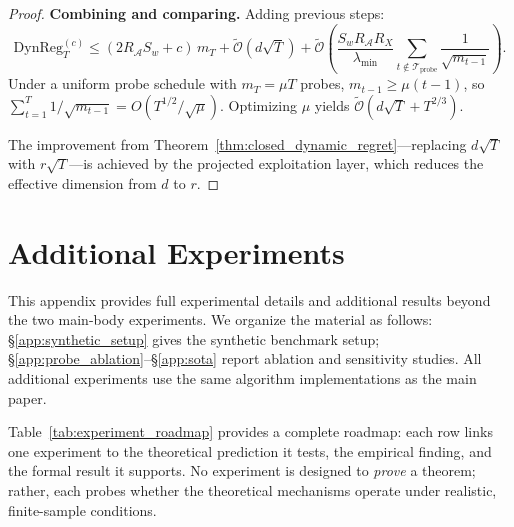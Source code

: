 \documentclass{article}
\newcommand{\cA}{\mathcal{A}}
\newcommand{\cTprobe}{\mathcal{T}_{\mathrm{probe}}}
\newcommand{\tilO}{\widetilde{\mathcal{O}}}
\newcommand{\DynReg}{\mathrm{DynReg}}
\begin{document}
\begin{proof}
\textbf{Combining and comparing.}
Adding previous steps:
\[
\DynReg_T^{(c)} \le (2R_{\cA} S_w + c)\,m_T + \tilO(d\sqrt{T}) + \tilO\!\left(\frac{S_w R_{\cA} R_X}{\lambda_{\min}}\sum_{t \notin \cTprobe}\frac{1}{\sqrt{m_{t-1}}}\right).
\]
Under a uniform probe schedule with $m_T = \mu T$ probes, $m_{t-1} \ge \mu(t-1)$, so $\sum_{t=1}^T 1/\sqrt{m_{t-1}} = O(T^{1/2}/\sqrt{\mu})$.  Optimizing $\mu$ yields $\tilO(d\sqrt{T} + T^{2/3})$.

The improvement from Theorem~\ref{thm:closed_dynamic_regret}---replacing $d\sqrt{T}$ with $r\sqrt{T}$---is achieved by the projected exploitation layer, which reduces the effective dimension from $d$ to $r$.
\end{proof}

\section{Additional Experiments}
\label{app:additional_experiments}


This appendix provides full experimental details and additional results
beyond the two main-body experiments.
We organize the material as follows:
\S\ref{app:synthetic_setup} gives the synthetic benchmark setup;
\S\ref{app:probe_ablation}--\S\ref{app:sota} report ablation and
sensitivity studies.
All additional experiments use the same algorithm implementations as
the main paper.

Table~\ref{tab:experiment_roadmap} provides a complete roadmap: each row links one experiment to the theoretical prediction it
  tests, the empirical finding, and the formal result it supports. No experiment is designed to \emph{prove} a theorem; rather, each
  probes whether the theoretical mechanisms operate under realistic, finite-sample conditions.
\end{document}
